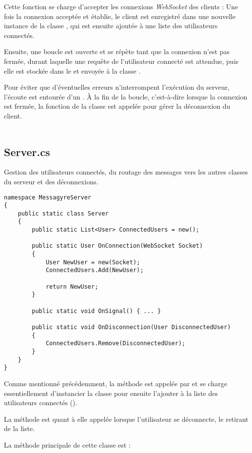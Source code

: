 \documentclass{article}
\begin{document}
Cette fonction se charge d'accepter les connexions \textit{WebSocket} des clients : Une fois la connexion acceptée et établie, le client est enregistré dans une nouvelle instance de la classe , qui est ensuite ajoutée à une liste des utilisateurs connectés.

Ensuite, une boucle est ouverte et se répète tant que la connexion n'est pas fermée, durant laquelle une requête de l'utilisateur connecté est attendue, puis elle est stockée dans le  et envoyée à la classe .

Pour éviter que d'éventuelles erreurs n'interrompent l'exécution du serveur, l'écoute est entourée d'un . À la fin de la boucle, c'est-à-dire lorsque la connexion est fermée, la fonction  de la classe  est appelée pour gérer la déconnexion du client.
\\\\
\subsection{Server.cs}

Gestion des utilisateurs connectés, du routage des messages vers les autres classes du serveur et des déconnexions.

\begin{verbatim}
namespace MessagyreServer
{
	public static class Server
	{
		public static List<User> ConnectedUsers = new();

		public static User OnConnection(WebSocket Socket)
		{
			User NewUser = new(Socket);
			ConnectedUsers.Add(NewUser);

			return NewUser;
		}

		public static void OnSignal() { ... }

		public static void OnDisconnection(User DisconnectedUser)
		{
			ConnectedUsers.Remove(DisconnectedUser);
		}
	}
}
\end{verbatim}

Comme mentionné précédemment, la méthode  est appelée par  et se charge essentiellement d'instancier la classe  pour ensuite l'ajouter à la liste des utilisateurs connectés ().

 La méthode  est quant à elle appelée lorsque l'utilisateur se déconnecte, le retirant de la liste.

 La méthode principale de cette classe est :
\end{document}
